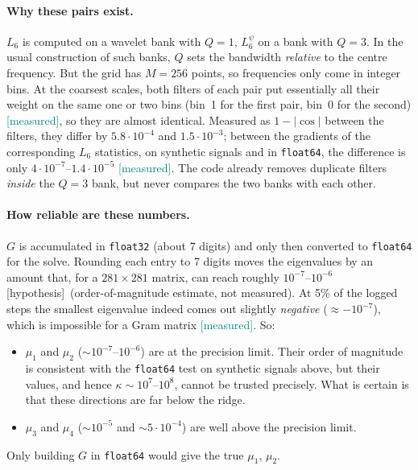 \documentclass[11pt,a4paper]{article}
\newcommand{\code}[1]{\texttt{#1}}
\newcommand{\meas}{\textcolor{teal}{\textsf{[measured]}}}
\newcommand{\hyp}{\textcolor{orange!80!black}{\textsf{[hypothesis]}}}
\begin{document}
\paragraph{Why these pairs exist.} $L_6$ is computed on a wavelet bank with $Q=1$, $L_6^\psi$ on a
bank with $Q=3$. In the usual construction of such banks, $Q$ sets the bandwidth \emph{relative} to the
centre frequency. But the grid has $M=256$ points, so frequencies only come in integer bins. At the
coarsest scales, both filters of each pair put essentially all their weight on the same one or two bins
(bin~1 for the first pair, bin~0 for the second) \meas, so they are almost identical. Measured as
$1-|\cos|$ between the filters, they differ by $5.8\cdot10^{-4}$ and $1.5\cdot10^{-3}$; between the
gradients of the corresponding $L_6$ statistics, on synthetic signals and in \code{float64}, the
difference is only $4\cdot10^{-7}$--$1.4\cdot10^{-5}$ \meas. The code already removes duplicate filters
\emph{inside} the $Q=3$ bank, but never compares the two banks with each other.

\paragraph{How reliable are these numbers.} $G$ is accumulated in \code{float32} (about 7 digits) and
only then converted to \code{float64} for the solve. Rounding each entry to 7 digits moves the eigenvalues
by an amount that, for a $281\times281$ matrix, can reach roughly $10^{-7}$--$10^{-6}$ \hyp\ (order-of-magnitude
estimate, not measured). At 5\% of the logged steps the smallest eigenvalue indeed comes out slightly
\emph{negative} ($\approx-10^{-7}$), which is impossible for a Gram matrix \meas. So:
\begin{itemize}
  \item $\mu_1$ and $\mu_2$ ($\sim10^{-7}$--$10^{-6}$) are at the precision limit. Their order of magnitude
    is consistent with the \code{float64} test on synthetic signals above, but their values, and hence
    $\kappa\sim10^7$--$10^8$, cannot be trusted precisely. What is certain is that these directions are
    far below the ridge.
  \item $\mu_3$ and $\mu_4$ ($\sim10^{-5}$ and $\sim5\cdot10^{-4}$) are well above the precision limit.
\end{itemize}
Only building $G$ in \code{float64} would give the true $\mu_1$, $\mu_2$.
\end{document}
